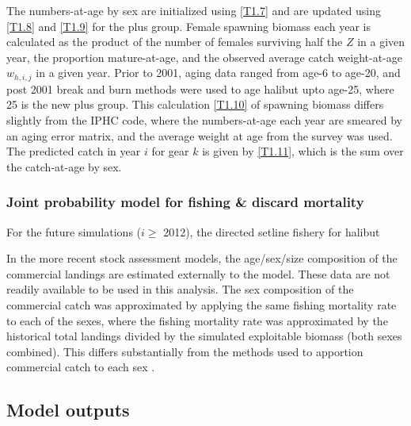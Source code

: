 The numbers-at-age by sex are initialized using \eqref{T1.7} and are updated using \eqref{T1.8} and \eqref{T1.9} for the plus group.  Female spawning biomass each year is calculated as the product of the number of females surviving half the $Z$ in a given year, the proportion mature-at-age, and the observed average catch weight-at-age $w_{h,i,j}$ in a given year.  Prior to 2001, aging data ranged from age-6 to age-20, and post 2001 break and burn methods were used to age halibut upto age-25, where 25 is the new plus group.  This calculation \eqref{T1.10} of spawning biomass differs slightly from the IPHC code, where the numbers-at-age each year are smeared by an aging error matrix, and the average weight at age from the survey was used. The predicted catch in year $i$ for gear $k$ is given by \eqref{T1.11}, which is the sum over the catch-at-age by sex.

\subsubsection{Joint probability model for fishing \& discard mortality} %
\label{ssub:joint_probability_for_fishing_&_discard_mortality}
For the future simulations ($i\geq$ 2012), the directed setline fishery for halibut 


In the more recent stock assessment models, the age/sex/size composition of the commercial landings are estimated externally to the model.  These data are not readily available to be used in this analysis.  The sex composition of the commercial catch was approximated by applying the same fishing mortality rate to each of the sexes, where the fishing mortality rate was approximated by the historical total landings divided by the simulated exploitable biomass (both sexes combined).  This differs substantially from the methods used to apportion commercial catch to each sex \cite[see][for details]{clark2004method}.



\subsection{Model outputs} %
\label{sub:model_outputs}




